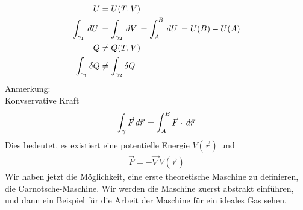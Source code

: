   \begin{align*}
    U & = U(T,V) \\
      \int_{\gamma_1}^{} \,dU\, & = \int_{\gamma_2}^{} \,dV\, = 
      \int_{A}^{B} \,dU\, = U(B)-U(A)\\
      Q  & \neq Q(T, V) \\
      \int_{\gamma_1}^{} \delta Q & \neq \int_{\gamma_2}^{} \delta Q
  \end{align*}
Anmerkung: \\
Konvservative Kraft
%
\begin{align*}
  \int_{\gamma}^{} \vec{F} \,d\vec{r}\, = \int_{A}^{B} \vec{F} \cdot \,d\vec{r}\,
\end{align*}
%
Dies bedeutet, es existiert eine potentielle Energie $V(\vec{r})$ und
%
\begin{align*}
  \vec{F} = - \vec{\nabla} V(\vec{r}) 
\end{align*}
%
Wir haben jetzt die M\"oglichkeit, eine erste theoretische Maschine zu definieren,
die Carnotsche-Maschine. Wir werden die Maschine zuerst abstrakt einf\"uhren, 
und dann ein Beispiel f\"ur die Arbeit der Maschine f\"ur ein ideales Gas sehen.
